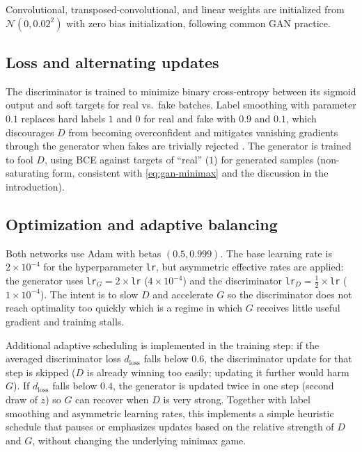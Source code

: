 \documentclass{article}
\theoremstyle{plain}
\theoremstyle{definition}
\theoremstyle{remark}
\begin{document}
Convolutional, transposed-convolutional, and linear weights are initialized from $\mathcal{N}(0, 0.02^2)$ with zero bias initialization, following common GAN practice.

\subsection{Loss and alternating updates}

The discriminator is trained to minimize binary cross-entropy between its sigmoid output and soft targets for real vs.\ fake batches. Label smoothing with parameter $0.1$ replaces hard labels $1$ and $0$ for real and fake with $0.9$ and $0.1$, which discourages $D$ from becoming overconfident and mitigates vanishing gradients through the generator when fakes are trivially rejected \cite{ImprovedGANs}.
The generator is trained to fool $D$, using BCE against targets of ``real'' ($1$) for generated samples (non-saturating form, consistent with \cref{eq:gan-minimax} and the discussion in the introduction).

\subsection{Optimization and adaptive balancing}

Both networks use Adam with betas $(0.5, 0.999)$. The base learning rate is $2\times 10^{-4}$ for the hyperparameter \texttt{lr}, but asymmetric effective rates are applied: the generator uses \texttt{lr}$_{\!G}=2\times$\texttt{lr} ($4\times 10^{-4}$) and the discriminator \texttt{lr}$_{\!D}=\frac{1}{2}\times$\texttt{lr} ($1\times 10^{-4}$). The intent is to slow $D$ and accelerate $G$ so the discriminator does not reach optimality too quickly which is a regime in which $G$ receives little useful gradient and training stalls.

Additional adaptive scheduling is implemented in the training step: if the averaged discriminator loss $d_{\mathrm{loss}}$ falls below $0.6$, the discriminator update for that step is skipped ($D$ is already winning too easily; updating it further would harm $G$). If $d_{\mathrm{loss}}$ falls below $0.4$, the generator is updated twice in one step (second draw of $z$) so $G$ can recover when $D$ is very strong.
Together with label smoothing and asymmetric learning rates, this implements a simple heuristic schedule that pauses or emphasizes updates based on the relative strength of $D$ and $G$, without changing the underlying minimax game.
\end{document}
